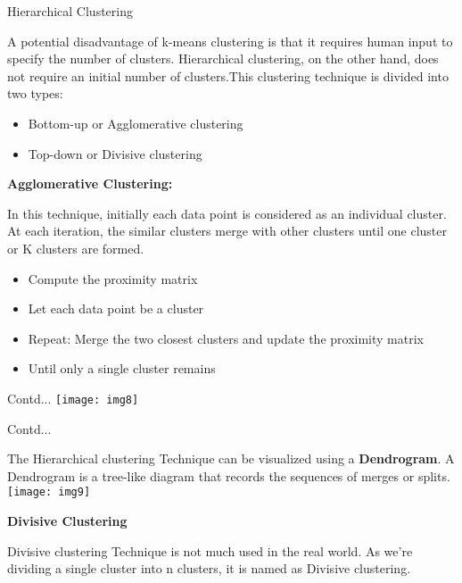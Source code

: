 \documentclass{beamer}
\newcommand\myheading[1]{%
  \par\bigskip
  {\large\bfseries#1}\par\smallskip}
\begin{document}
\begin{frame}{Hierarchical Clustering}
	\begin{flushleft}
		A potential disadvantage of k-means clustering is that it requires human input to specify the number of clusters. Hierarchical clustering, on the other hand, does not require an initial number of clusters.This clustering technique is divided into two types:
		\begin{itemize}
			\item Bottom-up or Agglomerative clustering
			\item Top-down or Divisive clustering
		\end{itemize}
		\myheading{Agglomerative Clustering:}
		In this technique, initially each data point is considered as an individual cluster. At each iteration, the similar clusters merge with other clusters until one cluster or K clusters are formed.\\
		\vspace{10pt}
		\begin{itemize}
			\item Compute the proximity matrix
			\item Let each data point be a cluster
			\item Repeat: Merge the two closest clusters and update the proximity matrix
			\item Until only a single cluster remains
		\end{itemize}
	\end{flushleft}
\end{frame}

\begin{frame}{Contd...}
	\texttt{[image: img8]}
\end{frame}

\begin{frame}{Contd...}
	\begin{flushleft}
		The Hierarchical clustering Technique can be visualized using a \textbf{Dendrogram}. A Dendrogram is a tree-like diagram that records the sequences of merges or splits.
		\texttt{[image: img9]}
		\myheading{Divisive Clustering}
		Divisive clustering Technique is not much used in the real world. As we’re dividing a single cluster into n clusters, it is named as Divisive clustering.
	\end{flushleft}
\end{frame}
\end{document}
